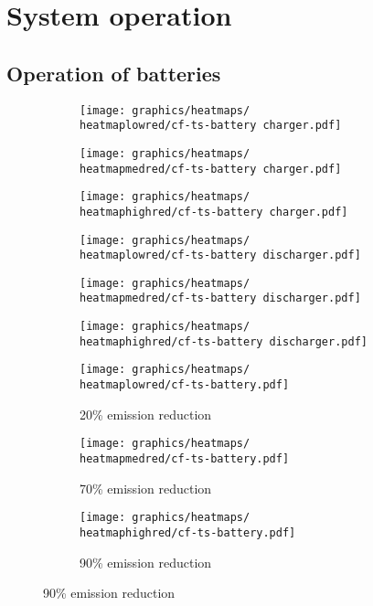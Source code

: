 \section{System operation}

\subsection{Operation of batteries}



\begin{figure}[h]
    \centering
        \begin{subfigure}[h]{0.33\textwidth}
            \centering
        \texttt{[image: graphics/heatmaps/\\heatmaplowred/cf-ts-battery charger.pdf]}
    \end{subfigure}
    \begin{subfigure}[h]{0.33\textwidth}
        \centering
        \texttt{[image: graphics/heatmaps/\\heatmapmedred/cf-ts-battery charger.pdf]}
    \end{subfigure}
    \begin{subfigure}[h]{0.33\textwidth}
        \centering
        \texttt{[image: graphics/heatmaps/\\heatmaphighred/cf-ts-battery charger.pdf]}
    \end{subfigure}


    \begin{subfigure}[h]{0.33\textwidth}
        \centering
        \texttt{[image: graphics/heatmaps/\\heatmaplowred/cf-ts-battery discharger.pdf]}
    \end{subfigure}
    \begin{subfigure}[h]{0.33\textwidth}
        \centering
        \texttt{[image: graphics/heatmaps/\\heatmapmedred/cf-ts-battery discharger.pdf]}
    \end{subfigure}
    \begin{subfigure}[h]{0.33\textwidth}
        \centering
        \texttt{[image: graphics/heatmaps/\\heatmaphighred/cf-ts-battery discharger.pdf]}
        
    \end{subfigure}


    \begin{subfigure}[h]{0.33\textwidth}
        \centering
        \texttt{[image: graphics/heatmaps/\\heatmaplowred/cf-ts-battery.pdf]}
        \caption{20\% emission reduction}
        \label{fig:operation20}
    \end{subfigure}
    \begin{subfigure}[h]{0.33\textwidth}
        \centering
        \texttt{[image: graphics/heatmaps/\\heatmapmedred/cf-ts-battery.pdf]}
        \caption{70\% emission reduction}
        \label{fig:operation70}
    \end{subfigure}
    \begin{subfigure}[h]{0.33\textwidth}
        \centering
        \texttt{[image: graphics/heatmaps/\\heatmaphighred/cf-ts-battery.pdf]}
        \caption{90\% emission reduction}
        \label{fig:operation90}
    \end{subfigure}


\end{figure}
